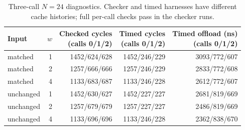 \begin{table}[!t]
\centering
\caption{Three-call $N=24$ diagnostics. Checker and timed harnesses have different cache histories; full per-call checks pass in the checker runs.}
\label{tab:warm}
\footnotesize
\setlength{\tabcolsep}{4pt}
\begin{tabular}{lrrrr}\toprule
Input & $w$ & \shortstack{Checked cycles\\(calls 0/1/2)} & \shortstack{Timed cycles\\(calls 0/1/2)} & \shortstack{Timed offload (ns)\\(calls 0/1/2)} \\ \midrule
matched & 1 & 1452/624/628 & 1452/246/229 & 3093/772/607 \\
matched & 2 & 1257/666/666 & 1257/246/229 & 2833/772/608 \\
matched & 4 & 1133/683/687 & 1133/246/228 & 2612/772/607 \\
unchanged & 1 & 1452/630/627 & 1452/227/227 & 2681/819/669 \\
unchanged & 2 & 1257/679/679 & 1257/227/227 & 2486/819/669 \\
unchanged & 4 & 1133/696/696 & 1133/246/228 & 2362/838/670 \\
\bottomrule
\end{tabular}
\end{table}
